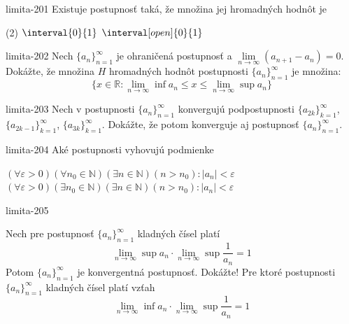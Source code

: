 \begin{defproblem}{limita-201}
Existuje postupnosť taká, že množina jej hromadných hodnôt je
\begin{tasks}(2)
\task $\interval{0}{1}$
\task $\interval[open]{0}{1}$
\end{tasks}
\end{defproblem}

\begin{defproblem}{limita-202}
Nech ${\{a_n\}}_{n=1}^\infty$ je ohraničená postupnosť a $\lim\limits_{n
\rightarrow \infty} (a_{n+1}-a_n)=0$. Dokážte, že množina $H$ hromadných hodnôt
postupnosti ${\{a_n\}}_{n=1}^\infty$ je množina:
\[
    \{x \in \mathbb{R}:
    \lim\limits_{n \rightarrow \infty} \inf a_n \leq x \leq \lim\limits_{n
    \rightarrow \infty} \sup a_n\}
\]
\end{defproblem}

\begin{defproblem}{limita-203}
Nech v postupnosti ${\{a_n\}}_{n=1}^\infty$ konvergujú podpostupnosti
${\{a_{2k}\}}_{k=1}^\infty$, ${\{a_{2k-1}\}}_{k=1}^\infty$,
${\{a_{3k}\}}_{k=1}^\infty$. Dokážte, že potom konverguje aj postupnosť
${\{a_n\}}_{n=1}^\infty$.
\end{defproblem}

\begin{defproblem}{limita-204}
Aké postupnosti vyhovujú podmienke
\begin{tasks}
\task
    $
        (\forall \varepsilon >0)
            (\forall n_0 \in \mathbb{N})
                (\exists n \in \mathbb{N})
                    (n > n_0): |a_n|< \varepsilon
    $
\task
    $
        (\forall \varepsilon > 0)
            (\exists n_0 \in \mathbb{N})
                (\exists n \in \mathbb{N})
                    (n > n_0): |a_n|< \varepsilon
    $
\end{tasks}
\end{defproblem}

\begin{defproblem}{limita-205}
\begin{tasks}
\task
    Nech pre postupnosť ${\{a_n\}}_{n=1}^\infty$ kladných čísel platí
    \[
        \lim\limits_{n \rightarrow \infty} \sup a_n
        \cdot
        \lim\limits_{n \rightarrow \infty} \sup \frac{1}{a_n} = 1
    \]
    Potom ${\{a_n\}}_{n=1}^\infty$ je konvergentná postupnosť. Dokážte!
\task
    Pre ktoré postupnosti ${\{a_n\}}_{n=1}^\infty$ kladných čísel platí vzťah
    \[
        \lim\limits_{n \rightarrow \infty} \inf a_n
        \cdot
        \lim\limits_{n \rightarrow \infty} \sup \frac{1}{a_n}=1
    \]
\end{tasks}
\end{defproblem}

